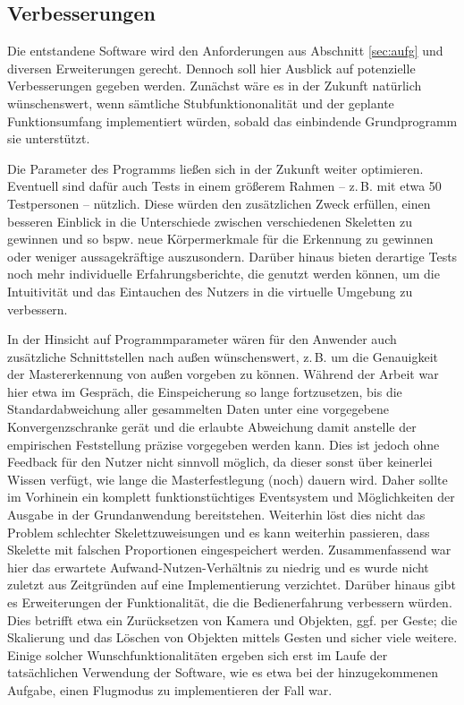 \subsection{Verbesserungen}
Die entstandene Software wird den Anforderungen aus Abschnitt \ref{sec:aufg} und diversen Erweiterungen gerecht. Dennoch soll hier Ausblick auf potenzielle Verbesserungen gegeben werden.
Zunächst wäre es in der Zukunft natürlich wünschenswert, wenn sämtliche Stubfunktiononalität und der geplante Funktionsumfang implementiert würden, sobald das einbindende Grundprogramm sie unterstützt.\par 
Die Parameter des Programms ließen sich in der Zukunft weiter optimieren. Eventuell sind dafür auch Tests in einem größerem Rahmen -- z.\,B. mit etwa 50 Testpersonen -- nützlich. Diese würden den zusätzlichen Zweck erfüllen, einen besseren Einblick in die Unterschiede zwischen verschiedenen Skeletten zu gewinnen und so bspw. neue Körpermerkmale für die Erkennung zu gewinnen oder weniger aussagekräftige auszusondern. Darüber hinaus bieten derartige Tests noch mehr individuelle Erfahrungsberichte, die genutzt werden können, um die Intuitivität und das Eintauchen des Nutzers in die virtuelle Umgebung zu verbessern.\par 
In der Hinsicht auf Programmparameter wären für den Anwender auch zusätzliche Schnittstellen nach außen wünschenswert, z.\,B. um die Genauigkeit der Mastererkennung von außen vorgeben zu können. Während der Arbeit war hier etwa im Gespräch, die Einspeicherung so lange fortzusetzen, bis die Standardabweichung aller gesammelten Daten unter eine vorgegebene Konvergenzschranke gerät und die erlaubte Abweichung damit anstelle der empirischen Feststellung präzise vorgegeben werden kann. Dies ist jedoch ohne Feedback für den Nutzer nicht sinnvoll möglich, da dieser sonst über keinerlei Wissen verfügt, wie lange die Masterfestlegung (noch) dauern wird. Daher sollte im Vorhinein ein komplett funktionstüchtiges Eventsystem und Möglichkeiten der Ausgabe in der Grundanwendung bereitstehen. Weiterhin löst dies nicht das Problem schlechter Skelettzuweisungen und es kann weiterhin passieren, dass Skelette mit falschen Proportionen eingespeichert werden. Zusammenfassend war hier das erwartete Aufwand-Nutzen-Verhältnis zu niedrig und es wurde nicht zuletzt aus Zeitgründen auf eine Implementierung verzichtet.
Darüber hinaus gibt es Erweiterungen der Funktionalität, die die Bedienerfahrung verbessern würden. Dies betrifft etwa ein Zurücksetzen von Kamera und Objekten, ggf. per Geste; die Skalierung und das Löschen von Objekten mittels Gesten und sicher viele weitere. Einige solcher Wunschfunktionalitäten ergeben sich erst im Laufe der tatsächlichen Verwendung der Software, wie es etwa bei der hinzugekommenen Aufgabe, einen Flugmodus zu implementieren der Fall war.
%
